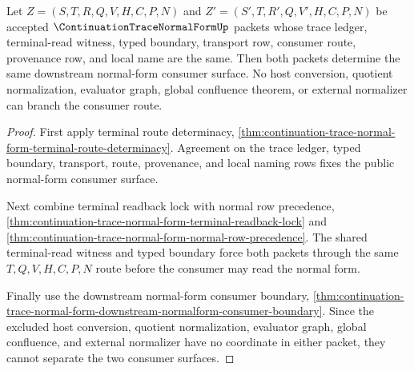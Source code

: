 \begin{theorem}
\label{thm:continuation-trace-normal-form-consumer-route-nonbranching}
Let $Z=(S,T,R,Q,V,H,C,P,N)$ and $Z'=(S',T,R',Q,V',H,C,P,N)$ be accepted $\ContinuationTraceNormalFormUp$ packets whose trace ledger, terminal-read witness, typed boundary, transport row, consumer route, provenance row, and local name are the same. Then both packets determine the same downstream normal-form consumer surface. No host conversion, quotient normalization, evaluator graph, global confluence theorem, or external normalizer can branch the consumer route.
\end{theorem}
\begin{proof}
First apply terminal route determinacy, \autoref{thm:continuation-trace-normal-form-terminal-route-determinacy}. Agreement on the trace ledger, typed boundary, transport, route, provenance, and local naming rows fixes the public normal-form consumer surface.

Next combine terminal readback lock with normal row precedence, \autoref{thm:continuation-trace-normal-form-terminal-readback-lock} and \autoref{thm:continuation-trace-normal-form-normal-row-precedence}. The shared terminal-read witness and typed boundary force both packets through the same $T,Q,V,H,C,P,N$ route before the consumer may read the normal form.

Finally use the downstream normal-form consumer boundary, \autoref{thm:continuation-trace-normal-form-downstream-normalform-consumer-boundary}. Since the excluded host conversion, quotient normalization, evaluator graph, global confluence, and external normalizer have no coordinate in either packet, they cannot separate the two consumer surfaces.
\end{proof}

